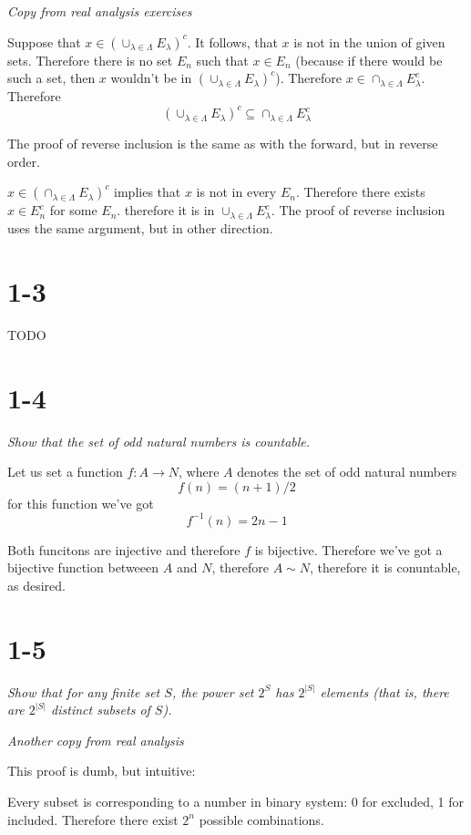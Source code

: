 \documentclass[11pt,oneside,titlepage]{book}
\begin{document}
\textit{Copy from real analysis exercises}

Suppose that $x \in \left(\cup_{\lambda \in \Lambda} E_\lambda \right)^c$. It
follows, that $x$ is not in the union of given sets. Therefore there is no
set $E_n$ such that $x \in E_n$ (because if there would be such a set, then $x$
wouldn't be in $\left(\cup_{\lambda \in \Lambda} E_\lambda \right)^c$).
Therefore $x \in \cap_{\lambda \in \Lambda} E_\lambda^c$. Therefore 
$$\left(\cup_{\lambda \in \Lambda} E_\lambda \right)^c \subseteq
\cap_{\lambda \in \Lambda} E_\lambda^c$$

The proof of reverse inclusion is the same as with the forward, but in reverse
order.

$x \in \left(\cap_{\lambda \in \Lambda} E_\lambda \right)^c$ implies that
$x$ is not in every $E_n$. Therefore there exists $x \in E_n^c$ for some $E_n$.
therefore it is in $\cup_{\lambda \in \Lambda} E_\lambda^c$. The proof of
reverse inclusion uses the same argument, but in other direction.

\section*{1-3}
TODO

\section*{1-4}
\textit{Show that the set of odd natural numbers is countable.}

Let us set a function $f: A \to N$, where $A$ denotes the set of
odd natural numbers
$$f(n) = (n + 1) / 2$$
for this function  we've got
$$f^{-1}(n) = 2n - 1$$

Both funcitons are injective and therefore $f$ is bijective. Therefore
we've got a bijective function betweeen $A$ and $N$, therefore
$A \sim N$, therefore it is conuntable, as desired.

\section*{1-5}
\textit{Show that for any finite set $S$, the power set $2^S$ has
  $2^{|S|}$ elements (that is, there are $2^{|S|}$ distinct subsets of $S$).}

\textit{Another copy from real analysis}

This proof is dumb, but intuitive:

Every subset is corresponding to a number in binary system: 0 for excluded,
1 for included. Therefore there exist $2^n$ possible combinations.
\end{document}
